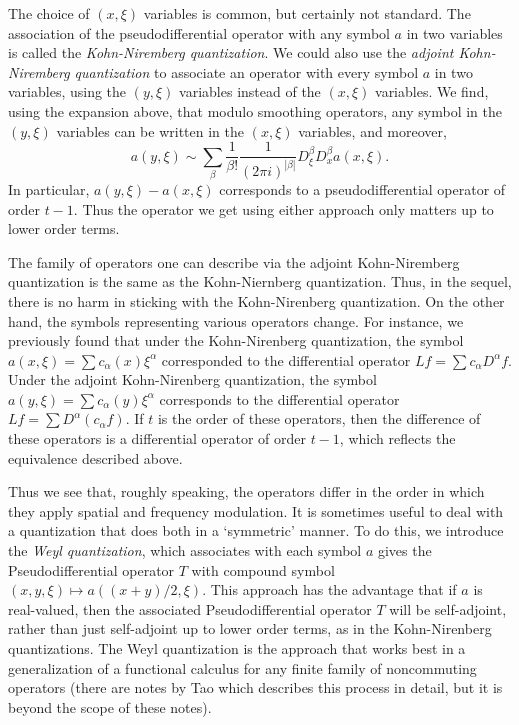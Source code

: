 The choice of $(x,\xi)$ variables is common, but certainly not standard. The association of the pseudodifferential operator with any symbol $a$ in two variables is called the \emph{Kohn-Niremberg quantization}. We could also use the \emph{adjoint Kohn-Niremberg quantization} to associate an operator with every symbol $a$ in two variables, using the $(y,\xi)$ variables instead of the $(x,\xi)$ variables. We find, using the expansion above, that modulo smoothing operators, any symbol in the $(y,\xi)$ variables can be written in the $(x,\xi)$ variables, and moreover,
%
\[ a(y,\xi) \sim \sum_\beta \frac{1}{\beta!} \frac{1}{(2 \pi i)^{|\beta|}} D^\beta_\xi D^\beta_x a(x,\xi). \]
%
In particular, $a(y,\xi) - a(x,\xi)$ corresponds to a pseudodifferential operator of order $t - 1$. Thus the operator we get using either approach only matters up to lower order terms.

The family of operators one can describe via the adjoint Kohn-Niremberg quantization is the same as the Kohn-Niernberg quantization. Thus, in the sequel, there is no harm in sticking with the Kohn-Nirenberg quantization. On the other hand, the symbols representing various operators change. For instance, we previously found that under the Kohn-Nirenberg quantization, the symbol $a(x,\xi) = \sum c_\alpha(x) \xi^\alpha$ corresponded to the differential operator $Lf = \sum c_\alpha D^\alpha f$. Under the adjoint Kohn-Nirenberg quantization, the symbol $a(y,\xi) = \sum c_\alpha(y) \xi^\alpha$ corresponds to the differential operator $Lf = \sum D^\alpha( c_\alpha f)$. If $t$ is the order of these operators, then the difference of these operators is a differential operator of order $t-1$, which reflects the equivalence described above.

Thus we see that, roughly speaking, the operators differ in the order in which they apply spatial and frequency modulation. It is sometimes useful to deal with a quantization that does both in a `symmetric' manner. To do this, we introduce the \emph{Weyl quantization}, which associates with each symbol $a$ gives the Pseudodifferential operator $T$ with compound symbol $(x,y,\xi) \mapsto a((x + y)/2, \xi)$. This approach has the advantage that if $a$ is real-valued, then the associated Pseudodifferential operator $T$ will be self-adjoint, rather than just self-adjoint up to lower order terms, as in the Kohn-Nirenberg quantizations. The Weyl quantization is the approach that works best in a generalization of a functional calculus for any finite family of noncommuting operators (there are notes by Tao which describes this process in detail, but it is beyond the scope of these notes).

